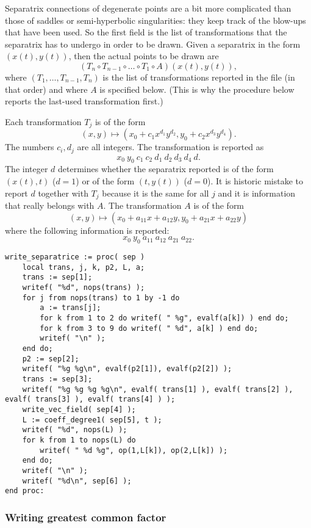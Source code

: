 \documentclass[a4paper,10pt]{article}
\begin{document}
Separatrix connections of degenerate points are a bit more complicated than those of saddles or semi-hyperbolic singularities: they keep track of the blow-ups that have been used.
So the first field is the list of transformations that the separatrix has to undergo in order to be drawn.  Given a separatrix in the form $(x(t),y(t))$, then the actual points to be drawn are
\[
    (T_{n}\circ T_{n-1}\circ\dots\circ T_1\circ A) (x(t),y(t)),
\]
where $(T_1,\dots,T_{n-1},T_n)$ is the list of transformations reported in the file (in that order) and where $A$ is specified below.  (This is why the procedure below reports the last-used transformation first.)

Each transformation $T_j$ is of the form
\[
    (x,y)\mapsto (x_0 + c_1x^{d_1}y^{d_2},y_0 + c_2x^{d_3}y^{d_4}).
\]
The numbers $c_i,d_j$ are all integers.  The transformation is reported as
\[
    x_0\: y_0\: c_1\: c_2\: d_1\: d_2\: d_3\: d_4\: d.
\]
The integer $d$ determines whether the separatrix reported is of the form $(x(t),t)$ ($d=1$) or of the form $(t,y(t))$ ($d=0$).  It is historic mistake to report $d$ together with $T_j$ because it is the same for all $j$ and it is information that really belongs with  $A$.  The transformation $A$ is of the form
\[
    (x,y) \mapsto (x_0 + a_{11}x + a_{12}y, y_0 + a_{21}x + a_{22}y)
\]
where the following information is reported:
\[
    x_0\: y_0\: a_{11}\: a_{12}\: a_{21}\: a_{22}.
\]


\begin{lstlisting}[name=writelog]
write_separatrice := proc( sep )
    local trans, j, k, p2, L, a;
    trans := sep[1];
    writef( "%d", nops(trans) );
    for j from nops(trans) to 1 by -1 do
        a := trans[j];
        for k from 1 to 2 do writef( " %g", evalf(a[k]) ) end do;
        for k from 3 to 9 do writef( " %d", a[k] ) end do;
        writef( "\n" );
    end do;
    p2 := sep[2];
    writef( "%g %g\n", evalf(p2[1]), evalf(p2[2]) );
    trans := sep[3];
    writef( "%g %g %g %g\n", evalf( trans[1] ), evalf( trans[2] ), evalf( trans[3] ), evalf( trans[4] ) );
    write_vec_field( sep[4] );
    L := coeff_degree1( sep[5], t );
    writef( "%d", nops(L) );
    for k from 1 to nops(L) do
        writef( " %d %g", op(1,L[k]), op(2,L[k]) );
    end do;
    writef( "\n" );
    writef( "%d\n", sep[6] );
end proc:
\end{lstlisting}

\subsubsection{Writing greatest common factor}
\end{document}
